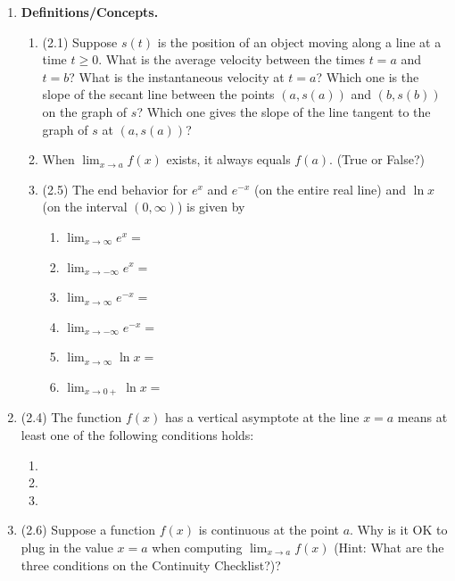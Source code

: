 \documentclass[11pt,letterpaper]{article}
\begin{document}
\begin{enumerate}
\item  \textbf{Definitions/Concepts.} 
\begin{enumerate}
\item (2.1) Suppose $s(t)$ is the position of an object moving along a line at a time $t\geq 0$.  What is the average velocity between the times $t=a$ and $t=b$?  What is the instantaneous velocity at $t=a$?  Which one is the slope of the secant line between the points $(a,s(a))$ and $(b,s(b))$ on the graph of $s$?  Which one gives the slope of the line tangent to the graph of $s$ at $(a,s(a))$? 

\item When $\lim_{x\to a}f(x)$ exists, it always equals $f(a)$.  (True or False?)

\item (2.5) The end behavior for $e^x$ and $e^{-x}$ (on the entire real line) and $\ln{x}$ (on the interval $(0,\infty)$) is given by
\begin{enumerate}
\item $\lim_{x\to\infty}e^x=$
\item $\lim_{x\to -\infty}e^x=$
\item $\lim_{x\to\infty}e^{-x}=$
\item $\lim_{x\to -\infty}e^{-x}=$
\item $\lim_{x\to\infty}\ln{x}=$
\item $\lim_{x\to 0+}\ln{x}=$
\end{enumerate}
\end{enumerate}

\item (2.4) The function $f(x)$ has a vertical asymptote at the line $x=a$ means at least one of the following conditions holds:
\begin{enumerate}
\item

\vspace{1pc}
\item 

\vspace{1pc}
\item 
\end{enumerate}

\item (2.6) Suppose a function $f(x)$ is continuous at the point $a$.  Why is it OK to plug in the value $x=a$ when computing $\lim_{x\to a}f(x)$ (Hint: What are the three conditions on the Continuity Checklist?)?

\end{enumerate}
\end{document}
